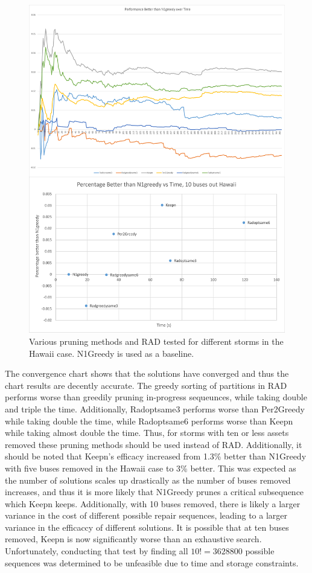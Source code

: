 \documentclass[12pt]{article}
\begin{document}
\begin{figure}[ht]
    \centering %
    \includegraphics[scale = 0.24]{Hawaii10busr2.pdf}
    \caption[Second Testing Set - 10 buses removed, Hawaii Case]{Various pruning methods and RAD tested for different storms in the Hawaii case. N1Greedy is used as a baseline.}
    \label{fig:Hawaii10busr2}
\end{figure}

The convergence chart shows that the solutions have converged and thus the chart results are decently accurate. The greedy sorting of partitions in RAD performs worse than greedily pruning in-progress sequeunces, while taking double and triple the time. Additionally, Radoptsame3 performs worse than Per2Greedy while taking double the time, while Radoptsame6 performs worse than Keepn while taking almost double the time. Thus, for storms with ten or less assets removed these pruning methods should be used instead of RAD. Additionally, it should be noted that Keepn's efficacy increased from 1.3\% better than N1Greedy with five buses removed in the Hawaii case to 3\% better. This was expected as the number of solutions scales up drastically as the number of buses removed increases, and thus it is more likely that N1Greedy prunes a critical subsequence which Keepn keeps. Additionally, with 10 buses removed, there is likely a larger variance in the cost of different possible repair sequences, leading to a larger variance in the efficaccy of different solutions. It is possible that at ten buses removed, Keepn is now significantly worse than an exhaustive search. Unfortunately, conducting that test by finding all $10! = 3628800$ possible sequences was determined to be unfeasible due to time and storage constraints. \par
\end{document}
